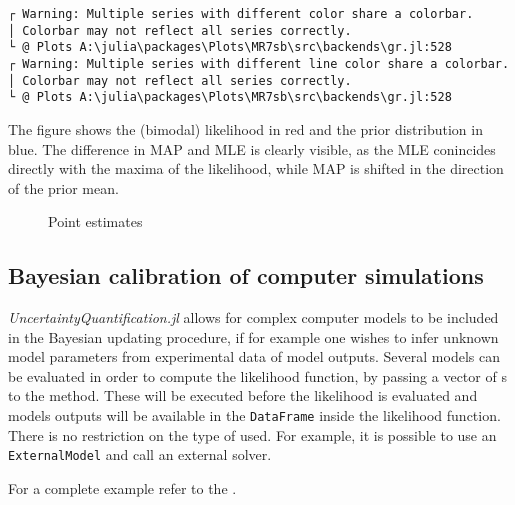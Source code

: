 \begin{verbatim}
┌ Warning: Multiple series with different color share a colorbar.
│ Colorbar may not reflect all series correctly.
└ @ Plots A:\julia\packages\Plots\MR7sb\src\backends\gr.jl:528
┌ Warning: Multiple series with different line color share a colorbar.
│ Colorbar may not reflect all series correctly.
└ @ Plots A:\julia\packages\Plots\MR7sb\src\backends\gr.jl:528
\end{verbatim}



The figure shows the (bimodal) likelihood in red and the prior distribution in blue. The difference in MAP and MLE is clearly visible, as the MLE conincides directly with the maxima of the likelihood, while MAP is shifted in the direction of the prior mean.



\begin{figure}
\centering
{}
\caption{Point estimates}
\end{figure}




\subsection{Bayesian calibration of computer simulations}



\label{4808027176221545699}{}


\emph{UncertaintyQuantification.jl} allows for complex computer models to be included in the Bayesian updating procedure, if for example one wishes to infer unknown model parameters from experimental data of model outputs. Several models can be evaluated in order to compute the likelihood function, by passing a vector of s to the  method. These will be executed before the likelihood is evaluated and models outputs will be available in the \texttt{DataFrame} inside the likelihood function. There is no restriction on the type of  used. For example, it is possible to use an \texttt{ExternalModel} and call an external solver.



For a complete example refer to the .



